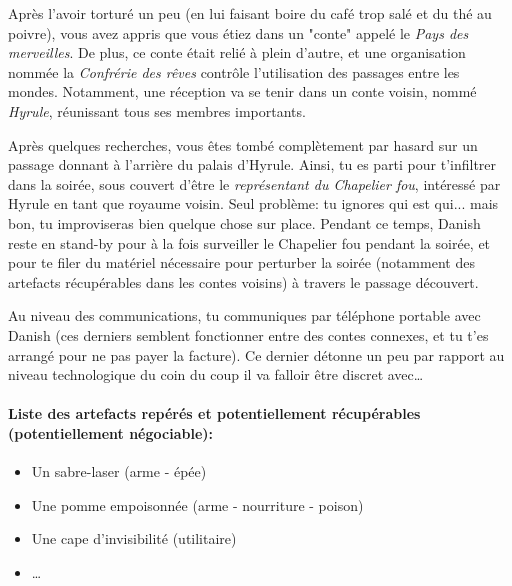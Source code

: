 {	\par Après l'avoir torturé un peu (en lui faisant boire du café trop salé et du thé au poivre), vous avez appris que vous étiez dans un "conte" appelé le \emph{Pays des merveilles}. De plus, ce conte était relié à plein d'autre, et une organisation nommée la \emph{Confrérie des rêves} contrôle l'utilisation des passages entre les mondes. Notamment, une réception va se tenir dans un conte voisin, nommé \emph{Hyrule}, réunissant tous ses membres importants.
	
	\par Après quelques recherches, vous êtes tombé complètement par hasard sur un passage donnant à l'arrière du palais d'Hyrule. Ainsi, tu es parti pour t'infiltrer dans la soirée, sous couvert d'être le \emph{représentant du Chapelier fou}, intéressé par Hyrule en tant que royaume voisin. Seul problème: tu ignores qui est qui... mais bon, tu improviseras bien quelque chose sur place. Pendant ce temps, Danish reste en stand-by pour à la fois surveiller le Chapelier fou pendant la soirée, et pour te filer du matériel nécessaire pour perturber la soirée (notamment des artefacts récupérables dans les contes voisins) à travers le passage découvert.
	
	Au niveau des communications, tu communiques par téléphone portable avec Danish (ces derniers semblent fonctionner entre des contes connexes, et tu t'es arrangé pour ne pas payer la facture). Ce dernier détonne un peu par rapport au niveau technologique du coin du coup il va falloir être discret avec\dots
	
	\paragraph{Liste des artefacts repérés et potentiellement récupérables (potentiellement négociable):}
	\begin{itemize}
		\item Un sabre-laser (arme - épée)
		\item Une pomme empoisonnée (arme - nourriture - poison)
		\item Une cape d'invisibilité (utilitaire)
		\item \dots
	\end{itemize}
}




